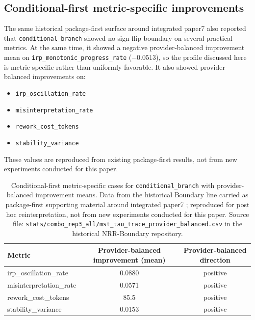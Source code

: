 \documentclass[11pt,a4paper]{article}
\begin{document}
\subsection{Conditional-first metric-specific improvements}

The same historical package-first surface around integrated paper7 \cite{saito2026boundary} also reported that \texttt{conditional\_branch} showed no sign-flip boundary on several practical metrics. At the same time, it showed a negative provider-balanced improvement mean on \texttt{irp\_monotonic\_progress\_rate} ($-0.0513$), so the profile discussed here is metric-specific rather than uniformly favorable. It also showed provider-balanced improvements on:
\begin{itemize}
  \item \texttt{irp\_oscillation\_rate}
  \item \texttt{misinterpretation\_rate}
  \item \texttt{rework\_cost\_tokens}
  \item \texttt{stability\_variance}
\end{itemize}

These values are reproduced from existing package-first results, not from new experiments conducted for this paper.

\begin{table}[h]
\centering
\small
\begin{tabular}{p{4.3cm}cc}
\toprule
Metric & Provider-balanced improvement (mean) & Provider-balanced direction \\
\midrule
irp\_oscillation\_rate & 0.0880 & positive \\
misinterpretation\_rate & 0.0571 & positive \\
rework\_cost\_tokens & 85.5 & positive \\
stability\_variance & 0.0153 & positive \\
\bottomrule
\end{tabular}
\caption{Conditional-first metric-specific cases for \texttt{conditional\_branch} with provider-balanced improvement means. Data from the historical Boundary line carried as package-first supporting material around integrated paper7 \cite{saito2026boundary}; reproduced for post hoc reinterpretation, not from new experiments conducted for this paper. Source file: \texttt{stats/combo\_rep3\_all/mst\_tau\_trace\_provider\_balanced.csv} in the historical NRR-Boundary repository.}
\label{tab:boundary_conditional_first}
\end{table}
\end{document}
